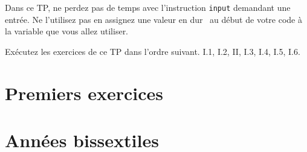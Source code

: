 

\usepackage{parcolumns}
\setlength{\parindent}{0pt}

 
Dans ce TP, ne perdez pas de temps avec l'instruction \texttt{input} demandant une entrée. Ne l'utilisez pas en assignez une valeur \og en dur\fg~ au début de votre code à la variable que vous allez utiliser.

Exécutez les exercices de ce TP dans l'ordre suivant. I.1, I.2, II, I.3, I.4, I.5, I.6.

\section{Premiers exercices}


\section{Années bissextiles}



